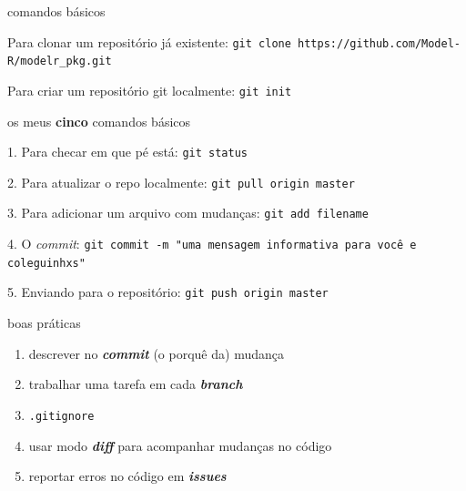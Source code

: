 \documentclass[11pt]{beamer}
\newcommand{\code}{\texttt}
\begin{document}
\begin{frame}{comandos básicos}

     \begin{block}{Para clonar um repositório já existente: }
      \code{git clone https://github.com/Model-R/modelr\_pkg.git}
      \end{block}
   \begin{block}{Para criar um repositório git localmente: }
         \code{git init}
        \end{block}



\end{frame}


\begin{frame}{os meus \textbf{cinco} comandos básicos}

     \begin{block}{1. Para checar em que pé está: }
      \code{git status}
      \end{block}


     \begin{block}{2. Para atualizar o repo localmente: }
      \code{git pull origin master}
      \end{block}

   \begin{block}{3. Para adicionar um arquivo com mudanças:}
         \code{git add filename}
        \end{block}
        
          \begin{block}{4. O \textit{commit}:}
         \code{git commit -m "uma mensagem informativa para você e coleguinhxs"}
        \end{block}

     \begin{block}{5. Enviando para o repositório:}
         \code{git push origin master}
        \end{block}


\end{frame}

\begin{frame}{boas práticas}

\begin{enumerate}

\pause \item descrever no \textbf{\textit{commit}} (o porquê da) mudança 

\pause \item trabalhar uma tarefa em cada \textbf{\textit{branch}}

\pause \item \code{.gitignore}

\pause \item usar modo \textit{\textbf{diff}} para acompanhar mudanças no código

\pause \item reportar erros no código em \textbf{\textit{issues}}

\end{enumerate}

\end{frame}
\end{document}
